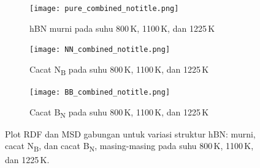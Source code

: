 \begin{figure}[htbp]
  \centering

  \begin{subfigure}{0.9\textwidth}
    \centering
    \texttt{[image: pure\_combined\_notitle.png]}
    \caption{hBN murni pada suhu 800 K, 1100 K, dan 1225 K}
    \label{subfig:rdf_msd_pure_combined}
  \end{subfigure}

  \vspace{1em}

  \begin{subfigure}{0.9\textwidth}
    \centering
    \texttt{[image: NN\_combined\_notitle.png]}
    \caption{Cacat N\textsubscript{B} pada suhu 800 K, 1100 K, dan 1225 K}
    \label{subfig:rdf_msd_nn_combined}
  \end{subfigure}

  \vspace{1em}

  \begin{subfigure}{0.9\textwidth}
    \centering
    \texttt{[image: BB\_combined\_notitle.png]}
    \caption{Cacat B\textsubscript{N} pada suhu 800 K, 1100 K, dan 1225 K}
    \label{subfig:rdf_msd_bb_combined}
  \end{subfigure}

  \caption{Plot RDF dan MSD gabungan untuk variasi struktur hBN: murni, cacat N\textsubscript{B}, dan cacat B\textsubscript{N}, masing-masing pada suhu 800 K, 1100 K, dan 1225 K.}
  \label{fig:rdf_msd_gabungan}
\end{figure}

